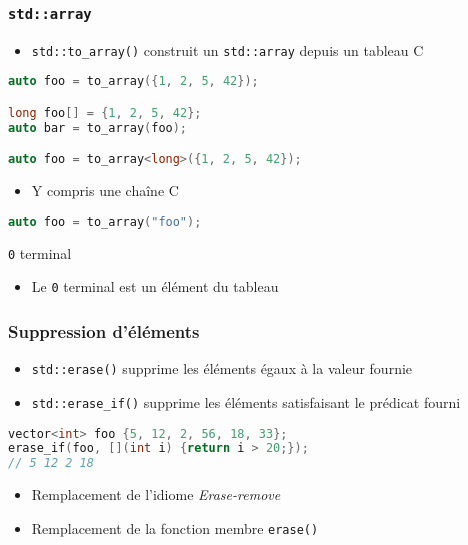 \documentclass[C++.tex]{subfiles}
\begin{document}
\begin{frame}[fragile]
	\frametitle{\lstinline|std::array|}
	\begin{itemize}
		\item \lstinline|std::to_array()| construit un \lstinline|std::array| depuis un tableau C
	\end{itemize}

	\begin{lstlisting}[language=C++]
auto foo = to_array({1, 2, 5, 42});

long foo[] = {1, 2, 5, 42};
auto bar = to_array(foo);

auto foo = to_array<long>({1, 2, 5, 42});\end{lstlisting}

	\begin{itemize}
		\item Y compris une chaîne C
	\end{itemize}

	\begin{lstlisting}[language=C++]
auto foo = to_array("foo");\end{lstlisting}

	\begin{alertblock}{\lstinline|0| terminal}
		\begin{itemize}
			\item Le \lstinline|0| terminal est un élément du tableau
		\end{itemize}
	\end{alertblock}
\end{frame}

\begin{frame}[fragile]
	\frametitle{Suppression d'éléments}
	\begin{itemize}
		\item \lstinline|std::erase()| supprime les éléments égaux à la valeur fournie
		\item \lstinline|std::erase_if()| supprime les éléments satisfaisant le prédicat fourni
	\end{itemize}

	\begin{lstlisting}[language=C++]
vector<int> foo {5, 12, 2, 56, 18, 33};
erase_if(foo, [](int i) {return i > 20;});
// 5 12 2 18\end{lstlisting}

	\begin{itemize}
		\item Remplacement de l'idiome \og \textit{Erase-remove}\fg{} 
		\item Remplacement de la fonction membre \lstinline|erase()|
	\end{itemize}
\end{frame}
\end{document}
